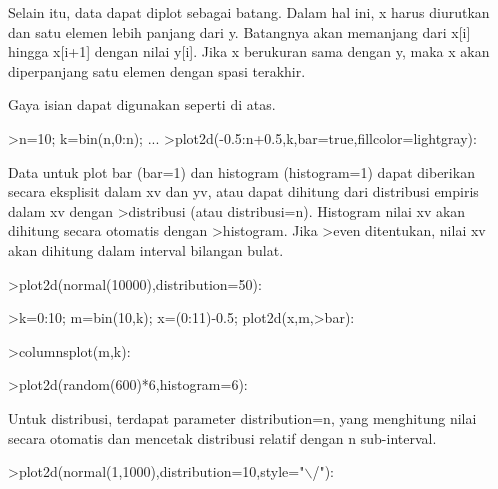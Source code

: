 \documentclass[a4paper,10pt]{article}
\begin{document}
\begin{eulernotebook}
\begin{eulercomment}
\begin{eulercomment}
\begin{eulercomment}
\begin{eulercomment}
\begin{eulercomment}
\begin{eulercomment}
\begin{eulercomment}
\begin{eulercomment}
\begin{eulercomment}
Selain itu, data dapat diplot sebagai batang. Dalam hal ini, x harus
diurutkan dan satu elemen lebih panjang dari y. Batangnya akan
memanjang dari x[i] hingga x[i+1] dengan nilai y[i]. Jika x berukuran
sama dengan y, maka x akan diperpanjang satu elemen dengan spasi
terakhir.

Gaya isian dapat digunakan seperti di atas.
\end{eulercomment}
\begin{eulerprompt}
>n=10; k=bin(n,0:n); ...
>plot2d(-0.5:n+0.5,k,bar=true,fillcolor=lightgray):
\end{eulerprompt}
\begin{eulercomment}
Data untuk plot bar (bar=1) dan histogram (histogram=1) dapat
diberikan secara eksplisit dalam xv dan yv, atau dapat dihitung dari
distribusi empiris dalam xv dengan \textgreater{}distribusi (atau distribusi=n).
Histogram nilai xv akan dihitung secara otomatis dengan \textgreater{}histogram.
Jika \textgreater{}even ditentukan, nilai xv akan dihitung dalam interval bilangan
bulat.
\end{eulercomment}
\begin{eulerprompt}
>plot2d(normal(10000),distribution=50):
\end{eulerprompt}
\begin{eulerprompt}
>k=0:10; m=bin(10,k); x=(0:11)-0.5; plot2d(x,m,>bar):
\end{eulerprompt}
\begin{eulerprompt}
>columnsplot(m,k):
\end{eulerprompt}
\begin{eulerprompt}
>plot2d(random(600)*6,histogram=6):
\end{eulerprompt}
\begin{eulercomment}
Untuk distribusi, terdapat parameter distribution=n, yang menghitung
nilai secara otomatis dan mencetak distribusi relatif dengan n
sub-interval.
\end{eulercomment}
\begin{eulerprompt}
>plot2d(normal(1,1000),distribution=10,style="\(\backslash\)/"):

\end{eulerprompt}
\end{eulercomment}
\end{eulercomment}
\end{eulercomment}
\end{eulercomment}
\end{eulercomment}
\end{eulercomment}
\end{eulercomment}
\end{eulercomment}
\end{eulernotebook}
\end{document}
